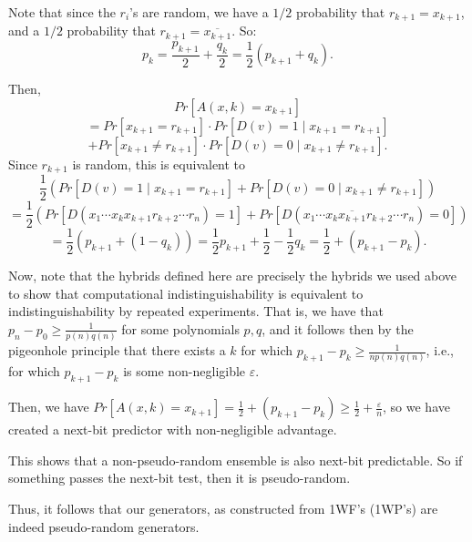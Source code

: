 \documentclass[11pt]{article}
\begin{document}
Note that since the \(r_i\)'s are random, we have a \(1/2\) probability that \(r_{k+1} = x_{k+1}\), and a \(1/2\) probability that \(r_{k+1} = \overline{x_{k+1}}\). So:
\[p_k = \frac{p_{k+1}}{2} + \frac{q_k}{2} = \frac{1}{2}(p_{k+1}+q_k).\]

Then,
\[Pr[A(x,k)=x_{k+1}]\]
\[ = Pr[x_{k+1}=r_{k+1}]\cdot Pr[D(v)=1\mid x_{k+1}=r_{k+1}]\]
\[ + Pr[x_{k+1}\ne r_{k+1}]\cdot Pr[D(v)=0\mid x_{k+1}\ne r_{k+1}] .\]
Since \(r_{k+1}\) is random, this is equivalent to
\[\frac{1}{2}(Pr[D(v)=1\mid x_{k+1}=r_{k+1}]+ Pr[D(v)=0\mid x_{k+1}\ne r_{k+1}])\]
\[ = \frac{1}{2}(Pr[D(x_1\cdots x_k x_{k+1}r_{k+2}\cdots r_n)=1]+Pr[D(x_1\cdots x_k\overline{x_{k+1}}r_{k+2}\cdots r_n)=0])\]
\[ = \frac{1}{2}(p_{k+1}+(1-q_k)) = \frac{1}{2}p_{k+1}+\frac{1}{2}-\frac{1}{2}q_k = \frac{1}{2}+(p_{k+1}-p_k).\]

Now, note that the hybrids defined here are precisely the hybrids we used above to show that computational indistinguishability is equivalent to indistinguishability by repeated experiments. That is, we have that \(p_n-p_0 \ge \frac{1}{p(n)q(n)}\) for some polynomials \(p,q\), and it follows then by the pigeonhole principle that there exists a \(k\) for which \(p_{k+1}-p_k \ge \frac{1}{n p(n)q(n)}\), i.e., for which \(p_{k+1}-p_k\) is some non-negligible \(\varepsilon\).\smallskip

Then, we have \(Pr[A(x,k)=x_{k+1}] = \frac{1}{2}+(p_{k+1}-p_k) \ge \frac{1}{2}+\frac{\varepsilon}{n}\), so we have created a next-bit predictor with non-negligible advantage.\medskip

This shows that a non-pseudo-random ensemble is also next-bit predictable. So if something passes the next-bit test, then it is pseudo-random.\medskip

Thus, it follows that our generators, as constructed from 1WF's (1WP's) are indeed pseudo-random generators.
\end{document}
